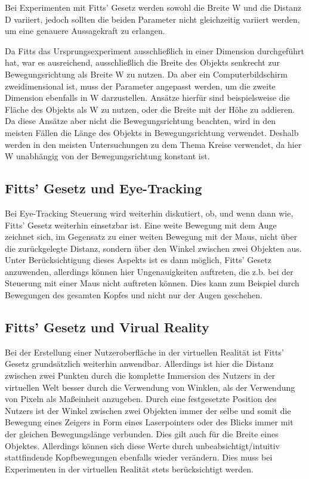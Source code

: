 Bei Experimenten mit Fitts' Gesetz werden sowohl die Breite W und die Distanz D variiert, jedoch sollten die beiden Parameter nicht gleichzeitig variiert werden, um eine genauere Aussagekraft zu erlangen. 

Da Fitts das Ursprungsexperiment ausschließlich in einer Dimension durchgeführt hat, war es ausreichend, ausschließlich die Breite des Objekts senkrecht zur Bewegungsrichtung als Breite W zu nutzen. Da aber ein Computerbildschirm zweidimensional ist, muss der Parameter angepasst werden, um die zweite Dimension ebenfalls in W darzustellen. Ansätze hierfür sind beispielsweise die Fläche des Objekts als W zu nutzen, oder die Breite mit der Höhe zu addieren. Da diese Ansätze aber nicht die Bewegungsrichtung beachten, wird in den meisten Fällen die Länge des Objekts in Bewegungsrichtung verwendet. Deshalb werden in den meisten Untersuchungen zu dem Thema Kreise verwendet, da hier W unabhängig von der Bewegungsrichtung konstant ist. 

\subsection{Fitts' Gesetz und Eye-Tracking}
Bei Eye-Tracking Steuerung wird weiterhin diskutiert, ob, und wenn dann wie, Fitts' Gesetz weiterhin einsetzbar ist. Eine weite Bewegung mit dem Auge zeichnet sich, im Gegensatz zu einer weiten Bewegung mit der Maus, nicht über die zurückgelegte Distanz, sondern über den Winkel zwischen zwei Objekten aus. Unter Berücksichtigung dieses Aspekts ist es dann möglich, Fitts' Gesetz anzuwenden, allerdings können hier Ungenauigkeiten auftreten, die z.b. bei der Steuerung mit einer Maus nicht auftreten können. Dies kann zum Beispiel durch Bewegungen des gesamten Kopfes und nicht nur der Augen geschehen.

\subsection{Fitts' Gesetz und Virual Reality}
Bei der Erstellung einer Nutzeroberfläche in der virtuellen Realität ist Fitts' Gesetz grundsätzlich weiterhin anwendbar. Allerdings ist hier die Distanz zwischen zwei Punkten durch die komplette Immersion des Nutzers in der virtuellen Welt besser durch die Verwendung von Winklen, als der Verwendung von Pixeln als Maßeinheit anzugeben. Durch eine festgesetzte Position des Nutzers ist der Winkel zwischen zwei Objekten immer der selbe und somit die Bewegung eines Zeigers in Form eines Laserpointers oder des Blicks immer mit der gleichen Bewegungslänge verbunden. Dies gilt auch für die Breite eines Objektes. Allerdings können sich diese Werte durch unbeabsichtigt/intuitiv stattfindende Kopfbewegungen ebenfalls wieder verändern. Dies muss bei Experimenten in der virtuellen Realität stets berücksichtigt werden.

